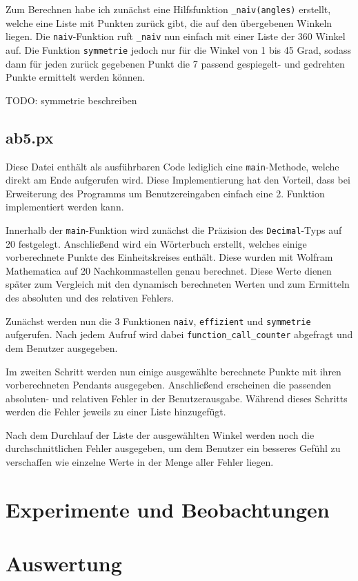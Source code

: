 \documentclass{scrartcl}
\begin{document}
	Zum Berechnen habe ich zunächst eine Hilfsfunktion \verb|_naiv(angles)| erstellt, welche eine Liste mit Punkten zurück gibt, die auf den übergebenen Winkeln liegen. Die \verb|naiv|-Funktion ruft \verb|_naiv| nun einfach mit einer Liste der 360 Winkel auf. Die Funktion \verb|symmetrie| jedoch nur für die Winkel von 1 bis 45 Grad, sodass dann für jeden zurück gegebenen Punkt die 7 passend gespiegelt- und gedrehten Punkte ermittelt werden können.
	
	TODO: symmetrie beschreiben
	
	\subsection{ab5.px}
	
	Diese Datei enthält als ausführbaren Code lediglich eine \verb|main|-Methode, welche direkt am Ende aufgerufen wird. Diese Implementierung hat den Vorteil, dass bei Erweiterung des Programms um Benutzereingaben einfach eine 2. Funktion implementiert werden kann.
	
	Innerhalb der \verb|main|-Funktion wird zunächst die Präzision des \verb|Decimal|-Typs auf 20 festgelegt. Anschließend wird ein Wörterbuch erstellt, welches einige vorberechnete Punkte des Einheitskreises enthält. Diese wurden mit Wolfram Mathematica auf 20 Nachkommastellen genau berechnet. Diese Werte dienen später zum Vergleich mit den dynamisch berechneten Werten und zum Ermitteln des absoluten und des relativen Fehlers.
	
	Zunächst werden nun die 3 Funktionen \verb|naiv|, \verb|effizient| und \verb|symmetrie| aufgerufen. Nach jedem Aufruf wird dabei \verb|function_call_counter| abgefragt und dem Benutzer ausgegeben.
	
	Im zweiten Schritt werden nun einige ausgewählte berechnete Punkte mit ihren vorberechneten Pendants ausgegeben. Anschließend erscheinen die passenden absoluten- und relativen Fehler in der Benutzerausgabe. Während dieses Schritts werden die Fehler jeweils zu einer Liste hinzugefügt.
	
	Nach dem Durchlauf der Liste der ausgewählten Winkel werden noch die durchschnittlichen Fehler ausgegeben, um dem Benutzer ein besseres Gefühl zu verschaffen wie einzelne Werte in der Menge aller Fehler liegen.
	
	
	
	\section{Experimente und Beobachtungen}
	
	
	
	\section{Auswertung}	
	
\end{document}
